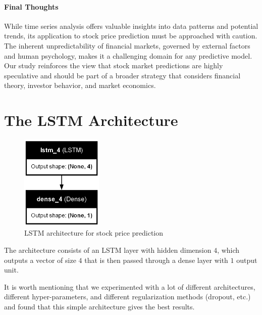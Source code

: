 \documentclass[12pt]{article}
\theoremstyle{definition}
\begin{document}
\paragraph{Final Thoughts}
While time series analysis offers valuable insights into data patterns and potential trends, its application to stock price prediction must be approached with caution. 
The inherent unpredictability of financial markets, governed by external factors and human psychology, makes it a challenging domain for any predictive model. 
Our study reinforces the view that stock market predictions are highly speculative and should be part of a broader strategy that considers financial theory, investor behavior, and market economics.

\printbibliography

\appendix

\section{The LSTM Architecture}\label{app: LSTM architecture}

\begin{figure}[H]
  \centering
  \includegraphics[width=0.35\textwidth]{Images/model_plot.png}
  \caption{LSTM architecture for stock price prediction}
\end{figure}

The architecture consists of an LSTM layer with hidden dimension \(4\), which outputs a vector
of size \(4\) that is then passed through a dense layer with \(1\) output unit.

It is worth mentioning that we 
experimented with a lot of different architectures, different hyper-parameters, and different regularization methods
(dropout, etc.) and found that this simple architecture gives the best results.
\end{document}
